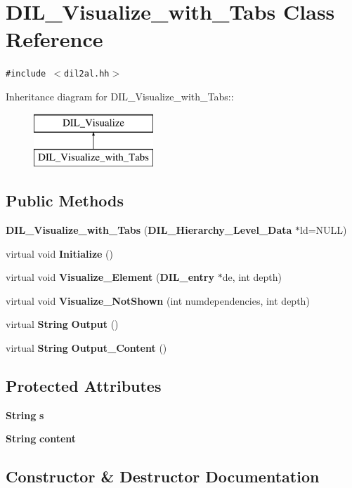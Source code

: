 \section{DIL\_\-Visualize\_\-with\_\-Tabs  Class Reference}
\label{classDIL__Visualize__with__Tabs}
{\tt \#include $<$dil2al.hh$>$}

Inheritance diagram for DIL\_\-Visualize\_\-with\_\-Tabs::\begin{figure}[H]
\begin{center}
\leavevmode
\includegraphics[height=2cm]{classDIL__Visualize__with__Tabs}
\end{center}
\end{figure}
\subsection*{Public Methods}
\begin{CompactItemize}
\item 
{\bf DIL\_\-Visualize\_\-with\_\-Tabs} ({\bf DIL\_\-Hierarchy\_\-Level\_\-Data} $\ast$ld=NULL)
\item 
virtual void {\bf Initialize} ()
\item 
virtual void {\bf Visualize\_\-Element} ({\bf DIL\_\-entry} $\ast$de, int depth)
\item 
virtual void {\bf Visualize\_\-Not\-Shown} (int numdependencies, int depth)
\item 
virtual {\bf String} {\bf Output} ()
\item 
virtual {\bf String} {\bf Output\_\-Content} ()
\end{CompactItemize}
\subsection*{Protected Attributes}
\begin{CompactItemize}
\item 
{\bf String} {\bf s}
\item 
{\bf String} {\bf content}
\end{CompactItemize}


\subsection{Constructor \& Destructor Documentation}
